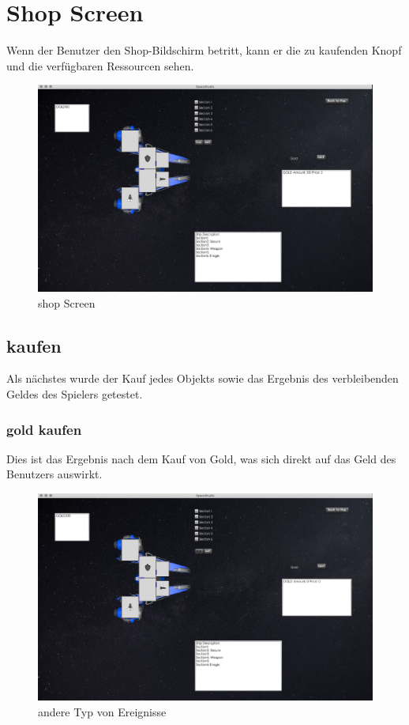 \documentclass[12pt]{article}
\begin{document}
\section{Shop Screen}
Wenn der Benutzer den Shop-Bildschirm betritt, kann er die zu kaufenden Knopf und die verfügbaren Ressourcen sehen.
\begin{figure}[h]
\centering
\includegraphics[scale=0.3]{TestProtocolBilder/shopScreen.png}
\caption{shop Screen}
\end{figure}

\subsection{kaufen}
Als nächstes wurde der Kauf jedes Objekts sowie das Ergebnis des verbleibenden Geldes des Spielers getestet.

\subsubsection{gold kaufen}
Dies ist das Ergebnis nach dem Kauf von Gold, was sich direkt auf das Geld des Benutzers auswirkt.
\begin{figure}[htp]
\centering
\includegraphics[scale=0.3]{TestProtocolBilder/goldgekauft.png}
\caption{andere Typ von Ereignisse}
\end{figure}
\newpage
\end{document}
